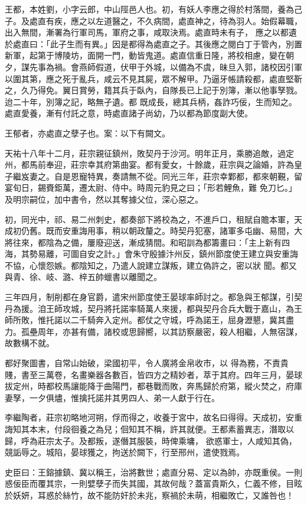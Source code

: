 \begin{pinyinscope}
 王都，本姓劉，小字云郎，中山陘邑人也。初，有妖人李應之得於村落間，養為己子。及處直有疾，應之以左道醫之，不久病間，處直神之，待為羽人。始假幕職，出入無間，漸署為行軍司馬，軍府之事，咸取決焉。處直時未有子，
 應之以都遺於處直曰：「此子生而有異。」因是都得為處直之子。其後應之閱白丁于管內，別置新軍，起第于博陵坊，面開一門，動皆鬼道。處直信重日隆，將校相慮，變在朝夕，謀先事為禍。會燕師假道，伏甲于外城，以備為不虞，昧旦入郭，諸校因引軍以圍其第，應之死于亂兵，咸云不見其屍，眾不解甲。乃逼牙帳請殺都，處直堅靳之，久乃得免。翼日賞勞，籍其兵于臥內，自隊長已上記于別簿，漸以他事孥戮。迨二十年，別簿之記，略無孑遺。都
 既成長，總其兵柄，姦詐巧佞，生而知之。處直愛養，漸有付託之意，時處直諸子尚幼，乃以都為節度副大使。



 王郁者，亦處直之孽子也。案：以下有闕文。



 天祐十八年十二月，莊宗親征鎮州，敗契丹于沙河。明年正月，乘勝追敵，過定州，都馬前奉迎，莊宗幸其府第曲宴。都有愛女，十餘歲，莊宗與之論婚，許為皇子繼岌妻之。自是恩寵特異，奏請無不從。同光三年，莊宗幸鄴都，都來朝覲，留宴旬日，錫賚鉅萬，遷太尉、侍中。時周元豹見之曰；「形若鯉魚，難
 免刀匕。」及明宗嗣位，加中書令，然以其奪據父位，深心惡之。



 初，同光中，祁、易二州刺史，都奏部下將校為之，不進戶口，租賦自贍本軍，天成初仍舊。既而安重誨用事，稍以朝政釐之。時契丹犯塞，諸軍多屯幽、易間，大將往來，都陰為之備，屢廢迎送，漸成猜間。和昭訓為都籌畫曰：「主上新有四海，其勢易離，可圖自安之計。」會朱守殷據汴州反，鎮州節度使王建立與安重誨不協，心懷怨嫉。都陰知之，乃遣人說建立謀叛，建立偽許之，密以狀
 聞。都又與青、徐、岐、潞、梓五帥蠟書以離聞之。



 三年四月，制削都在身官爵，遣宋州節度使王晏球率師討之。都急與王郁謀，引契丹為援。洎王師攻城，契丹將托諾率騎萬人來援，都與契丹合兵大戰于嘉山，為王師所敗，惟托諾以二千騎奔入定州。都仗之守城，呼為諾王，屈身瀝懇，冀其盡力。孤壘周年，亦甚有備，諸校或思歸嚮，以其訪察嚴密，殺人相繼，人無宿謀，故數構不就。



 都好聚圖書，自常山始破，梁國初平，令人廣將金帛收市，以
 得為務，不責貴賤，書至三萬卷，名畫樂器各數百，皆四方之精妙者，萃于其府。四年三月，晏球拔定州，時都校馬讓能降于曲陽門，都巷戰而敗，奔馬歸於府第，縱火焚之，府庫妻孥，一夕俱燼，惟擒托諾并其男四人、弟一人獻于行在。



 李繼陶者，莊宗初略地河朔，俘而得之，收養于宮中，故名曰得得。天成初，安重誨知其本末，付段徊養之為兒；佪知其不稱，許其就便。王都素蓄異志，潛取以歸，呼為莊宗太子。及都叛，遂僭其服裝，時俾乘墉，
 欲惑軍士，人咸知其偽，競詬辱之。城陷，晏球獲之，拘送於闕下，行至邢州，遣使戮焉。



 史臣曰：王鎔據鎮、冀以稱王，治將數世；處直分易、定以為帥，亦既重侯。一則惑佞臣而覆其宗，一則嬖孽子而失其國，其故何哉？蓋富貴斯久，仁義不修，目眩於妖妍，耳惑於絲竹，故不能防奸於未兆，察禍於未萌，相繼敗亡，又誰咎也！



\end{pinyinscope}